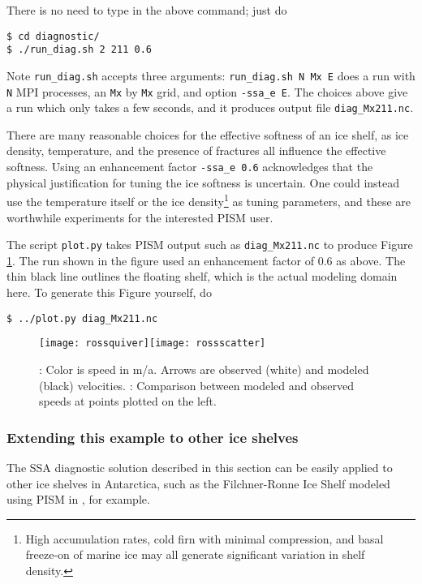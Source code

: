 There is no need to type in the above command; just do

\begin{verbatim}
$ cd diagnostic/
$ ./run_diag.sh 2 211 0.6
\end{verbatim}%

Note \texttt{run_diag.sh} accepts three arguments: \texttt{run_diag.sh N Mx E} does a run with
\texttt{N} MPI processes, an \texttt{Mx} by \texttt{Mx} grid, and option \texttt{-ssa_e E}.  The choices above give a run which only takes a few seconds, and it produces output file \texttt{diag_Mx211.nc}.

There are many reasonable choices for the effective softness of an ice shelf, as ice density, temperature, and the presence of fractures all influence the effective softness.  Using an enhancement factor \texttt{-ssa_e 0.6} acknowledges that the physical justification for tuning the ice softness is uncertain.  One could instead use the temperature itself or the ice density\footnote{High accumulation rates, cold firn with minimal compression, and basal freeze-on of marine ice may all generate significant variation in shelf density.} as tuning parameters, and these are worthwhile experiments for the interested PISM user.

The script \texttt{plot.py} takes PISM output such as \texttt{diag_Mx211.nc} to produce Figure \ref{fig:rosspython}.  The run shown in the figure used an enhancement factor of $0.6$ as above.  The thin black line outlines the floating shelf, which is the actual modeling domain here.  To generate this Figure yourself, do

\begin{verbatim}
$ ../plot.py diag_Mx211.nc
\end{verbatim}%

\begin{figure}[ht]
\centering
\mbox{\texttt{[image: rossquiver]}\quad \texttt{[image: rossscatter]}}
\caption{: Color is speed in m/a.  Arrows are observed (white) and modeled (black) velocities.  : Comparison between modeled and observed speeds at points plotted on the left.}
\label{fig:rosspython}
\end{figure}

\subsubsection*{Extending this example to other ice shelves}  The SSA diagnostic solution described in this section can be easily applied to other ice shelves in Antarctica, such as the Filchner-Ronne Ice Shelf modeled using PISM in \cite{AlbrechtLevermann2012}, for example.

